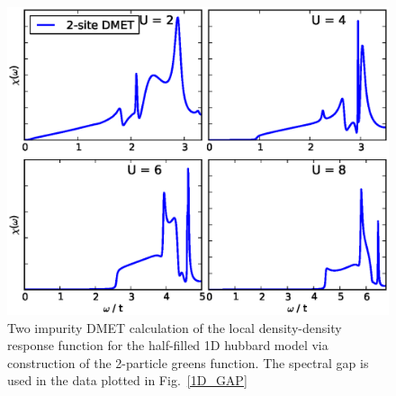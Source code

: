 \documentclass[aps,showpacs,twocolumn,nobibnotes]{revtex4}
\begin{document}
\begin{figure}
\begin{center}
\includegraphics[scale=0.475]{Plots/1D_DD/1D_Hub_DD.eps}
\end{center}
\caption{Two impurity DMET calculation of the local density-density response function for the half-filled 1D hubbard model via construction of the 2-particle greens function.
The spectral gap is used in the data plotted in Fig.~\ref{1D_GAP}}
\label{1D_DD}
\end{figure}




\end{document}
